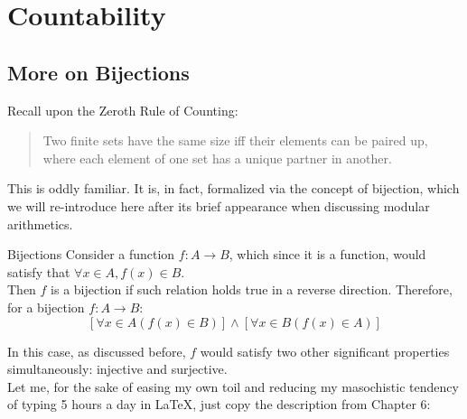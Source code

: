 \chapter{Countability}

\section{More on Bijections}
Recall upon the Zeroth Rule of Counting:
\begin{quote}
    Two finite sets have the same size iff their elements can be paired up, where each element of one set has a unique partner in another.
\end{quote}
This is oddly familiar. It is, in fact, formalized via the concept of bijection, which we will re-introduce here after its brief appearance when discussing modular arithmetics.
\begin{ln-define}{Bijections}{}
    Consider a function $f: A \rightarrow B$, which since it is a function, would satisfy that $\forall x \in A, f(x) \in B$. \\
    Then $f$ is a bijection if such relation holds true in a reverse direction. Therefore, for a bijection $f: A \rightarrow B$:
    \[[\forall x \in A (f(x) \in B)] \land [\forall x \in B (f(x) \in A)]\]
\end{ln-define}
In this case, as discussed before, $f$ would satisfy two other significant properties simultaneously: injective and surjective. \\
Let me, for the sake of easing my own toil and reducing my masochistic tendency of typing 5 hours a day in \LaTeX, just copy the description from Chapter 6:
